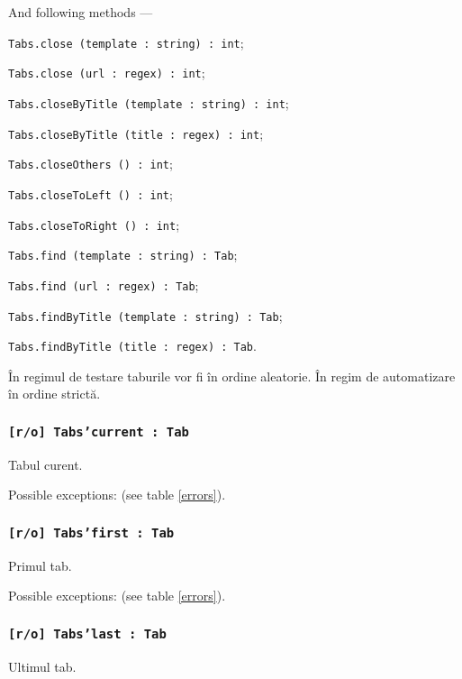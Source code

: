 And following methods —
\begin{icItems}
	\item \texttt{Tabs.close (template : string) : int};
	\item \texttt{Tabs.close (url : regex) : int};
	\item \texttt{Tabs.closeByTitle (template : string) : int};
	\item \texttt{Tabs.closeByTitle (title : regex) : int};
	\item \texttt{Tabs.closeOthers () : int};
	\item \texttt{Tabs.closeToLeft () : int};
	\item \texttt{Tabs.closeToRight () : int};
	\item \texttt{Tabs.find (template : string) : Tab};
	\item \texttt{Tabs.find (url : regex) : Tab};
	\item \texttt{Tabs.findByTitle (template : string) : Tab};
	\item \texttt{Tabs.findByTitle (title : regex) : Tab}.
\end{icItems}

În regimul de testare taburile vor fi în ordine aleatorie. În regim de automatizare în ordine strictă.

\subsubsection{\texttt{[r/o] Tabs'current : Tab}}

Tabul curent.

Possible exceptions:  (see table \ref{errors}).

\subsubsection{\texttt{[r/o] Tabs'first : Tab}}

Primul tab.

Possible exceptions:  (see table \ref{errors}).

\subsubsection{\texttt{[r/o] Tabs'last : Tab}}

Ultimul tab.

